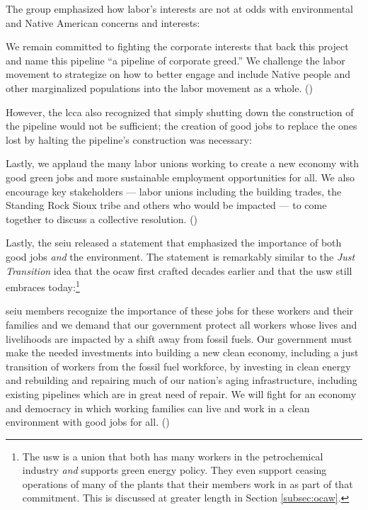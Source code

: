 \documentclass[12pt]{article}
\renewenvironment{quote}
  {\list{}{\leftmargin=\parindent\rightmargin=0pt}%
   \item\relax}
  {\endlist}
\begin{document}
The group emphasized how labor’s interests are not at odds with environmental and Native American concerns and interests:

\begin{quote}
We remain committed to fighting the corporate interests that back this project and name this pipeline “a pipeline of corporate greed.” We challenge the labor movement to strategize on how to better engage and include Native people and other marginalized populations into the labor movement as a whole. (\cite{apalaAFLCIOConstituencyGroups2016})
\end{quote}

\noindent However, the \acrshort{lcca} also recognized that simply shutting down the construction of the pipeline would not be sufficient; the creation of good jobs to replace the ones lost by halting the pipeline’s construction was necessary:

\begin{quote}
Lastly, we applaud the many labor unions working to create a new economy with good green jobs and more sustainable employment opportunities for all. We also encourage key stakeholders — labor unions including the building trades, the Standing Rock Sioux tribe and others who would be impacted — to come together to discuss a collective resolution. (\cite{apalaAFLCIOConstituencyGroups2016})
\end{quote}

\noindent Lastly, the \acrshort{seiu} released a statement that emphasized the importance of both good jobs \emph{and} the environment. The statement is remarkably similar to the \textit{Just Transition} idea that the \acrfull{ocaw} first crafted decades earlier and that the \acrfull{usw} still embraces today:\footnote{The \acrshort{usw} is a union that both has many workers in the petrochemical industry \emph{and} supports green energy policy. They even support ceasing operations of many of the plants that their members work in as part of that commitment. This is discussed at greater length in Section \ref{subsec:ocaw}.}

\begin{quote}
\acrshort{seiu} members recognize the importance of these jobs for these workers and their families and we demand that our government protect all workers whose lives and livelihoods are impacted by a shift away from fossil fuels. Our government must make the needed investments into building a new clean economy, including a just transition of workers from the fossil fuel workforce, by investing in clean energy and rebuilding and repairing much of our nation’s aging infrastructure, including existing pipelines which are in great need of repair. We will fight for an economy and democracy in which working families can live and work in a clean environment with good jobs for all. (\cite{nlfUnionsWeighDakota2016})
\end{quote}
\end{document}

